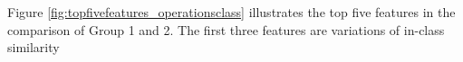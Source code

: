 Figure \ref{fig:topfivefeatures_operationsclass} illustrates the top five features in the comparison of Group 1 and 2. The first three features are variations of in-class similarity